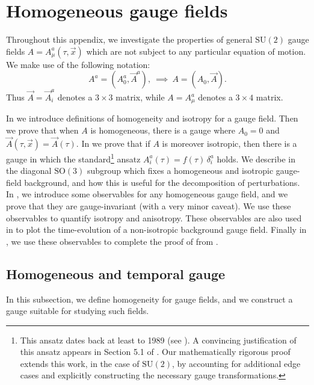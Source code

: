 
\section{\label{app:gaugefields}Homogeneous gauge fields}

Throughout this appendix, we investigate the properties of general $\mathrm{SU}(2)$ gauge fields $A=A_{\mu}^{a}(\tau,\vec{x})$ which are not subject to any particular equation of motion. We make use of the following notation: 
\[
A^{a}=(A_{0}^{a},\vec{A}^{a}),\ \implies\ A=(A_{0},\vec{A}).
\]
 Thus $\vec{A}=\vec{A}_{i}^{a}$ denotes a $3\times3$ matrix, while $A=A_{\mu}^{a}$ denotes a $3\times4$ matrix.

In  we introduce definitions of homogeneity and isotropy for a gauge field. Then we prove that when $A$ is homogeneous, there is a gauge where $A_{0}=0$ and $\vec{A}(\tau,\vec{x})=\vec{A}(\tau)$. In  we prove that if $A$ is moreover isotropic, then there is a gauge in which the standard\footnote{This ansatz dates back at least to 1989 (see \cite{Verbin:1989sg}). A convincing justification of this ansatz appears in Section 5.1 of \cite{Maleknejad:2012fw}. Our mathematically rigorous proof extends this work, in the case of $\mathrm{SU}(2)$, by accounting for additional edge cases and explicitly constructing the necessary gauge transformations. } ansatz $A_{i}^{a}(\tau)=f(\tau)\,\delta_{i}^{a}$ holds. We describe in  the diagonal $\mathrm{SO}(3)$ subgroup which fixes a homogeneous and isotropic gauge-field background, and how this is useful for the decomposition of perturbations. In , we introduce some observables for any homogeneous gauge field, and we prove that they are gauge-invariant (with a very minor caveat). We use these observables to quantify isotropy and anisotropy. These observables are also used in  to plot the time-evolution of a non-isotropic background gauge field. Finally in , we use these observables to complete the proof of  from . 

\subsection{\label{app:homo-gauge}Homogeneous and temporal gauge }

In this subsection, we define homogeneity for gauge fields, and we construct a gauge suitable for studying such fields.

